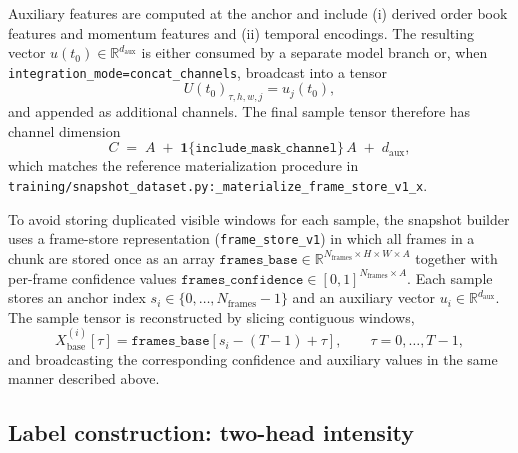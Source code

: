\documentclass[11pt]{article}
\begin{document}
Auxiliary features are computed at the anchor and include (i) derived order book features and momentum features and (ii) temporal encodings. The resulting vector $u(t_0)\in\mathbb{R}^{d_{\mathrm{aux}}}$ is either consumed by a separate model branch or, when \texttt{integration\_mode=concat\_channels}, broadcast into a tensor
\begin{equation}
  U(t_0)_{\tau,h,w,j} = u_j(t_0),
\end{equation}
and appended as additional channels. The final sample tensor therefore has channel dimension
\begin{equation}
  C \;=\; A \; +\; \mathbf{1}\{\texttt{include\_mask\_channel}\}\,A \; +\; d_{\mathrm{aux}},
\end{equation}
which matches the reference materialization procedure in \texttt{training/snapshot\_dataset.py:\_materialize\_frame\_store\_v1\_x}.

To avoid storing duplicated visible windows for each sample, the snapshot builder uses a frame-store representation (\texttt{frame\_store\_v1}) in which all frames in a chunk are stored once as an array $\texttt{frames\_base}\in\mathbb{R}^{N_{\mathrm{frames}}\times H\times W\times A}$ together with per-frame confidence values $\texttt{frames\_confidence}\in[0,1]^{N_{\mathrm{frames}}\times A}$. Each sample stores an anchor index $s_i\in\{0,\ldots,N_{\mathrm{frames}}-1\}$ and an auxiliary vector $u_i\in\mathbb{R}^{d_{\mathrm{aux}}}$. The sample tensor is reconstructed by slicing contiguous windows,
\begin{equation}
  X_{\mathrm{base}}^{(i)}[\tau] = \texttt{frames\_base}[s_i-(T-1)+\tau], \qquad \tau=0,\ldots,T-1,
\end{equation}
and broadcasting the corresponding confidence and auxiliary values in the same manner described above.

\subsection{Label construction: two-head intensity}
\end{document}

